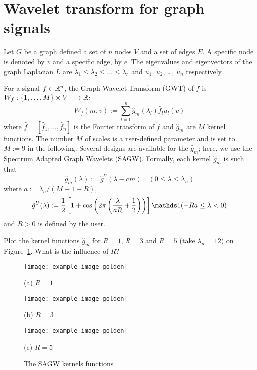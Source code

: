 \documentclass[11pt]{article}
\begin{document}
\newpage
\section{Wavelet transform for graph signals}
Let $G$ be a graph defined a set of $n$ nodes $V$ and a set of edges $E$. A specific node is denoted by $v$ and a specific edge, by $e$.
The eigenvalues and eigenvectors of the graph Laplacian $L$ are $\lambda_1\leq\lambda_2\leq\dots\leq \lambda_n$ and $u_1$, $u_2$, \dots, $u_n$ respectively.

For a signal $f\in\mathbb{R}^{n}$, the Graph Wavelet Transform (GWT) of $f$ is $ W_f: \{1,\dots,M\}\times V \longrightarrow \mathbb{R}$:
\begin{equation}
    W_f(m, v) := \sum_{l=1}^n \hat{g}_m(\lambda_l)\hat{f}_l u_l(v)
\end{equation}
where $\hat{f}= [\hat{f}_1,\dots,\hat{f}_n]$ is the Fourier transform of $f$ and $\hat{g}_m$ are $M$ kernel functions.
The number $M$ of scales is a user-defined parameter and is set to $M:=9$ in the following.
Several designs are available for the $\hat{g}_m$; here, we use the Spectrum Adapted Graph Wavelets (SAGW).
Formally, each kernel $\hat{g}_m$ is such that
\begin{equation}
    \hat{g}_m(\lambda) := \hat{g}^U(\lambda - am) \quad (0\leq\lambda\leq\lambda_n)
\end{equation}
where $a:=\lambda_n / (M+1-R)$,
\begin{equation}
    \hat{g}^U(\lambda) := \frac{1}{2}\left[ 1 + \cos\left( 2\pi\left(\frac{\lambda}{a R}  + \frac{1}{2} \right)\right) \right]\one(-Ra \leq \lambda < 0)
\end{equation}
and $R>0$ is defined by the user.

\begin{exercise}
Plot the kernel functions $\hat{g}_m$ for $R=1$, $R=3$ and $R=5$ (take $\lambda_n=12$) on Figure~\ref{fig:sagw-kernels}. What is the influence of $R$?
\end{exercise}

\begin{solution}
\begin{figure}
    \centering
    \begin{minipage}[t]{0.32\textwidth}
    \centerline{\texttt{[image: example-image-golden]}}
    \centerline{(a) $R=1$}
    \end{minipage}
    \hfill
    \begin{minipage}[t]{0.32\textwidth}    \centerline{\texttt{[image: example-image-golden]}}
    \centerline{(b) $R=3$}
    \end{minipage}
    \hfill
    \begin{minipage}[t]{0.32\textwidth}    \centerline{\texttt{[image: example-image-golden]}}
    \centerline{(c) $R=5$}
    \end{minipage}
    \caption{The SAGW kernels functions}\label{fig:sagw-kernels}
\end{figure}
\end{solution}
\end{document}
